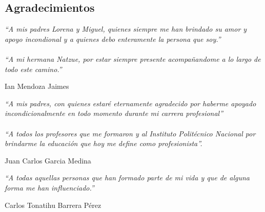 
\begin{comment}
\begin{acknowledgements}

También quisiera reconocer a ... por ...CONACYT,  PAPIIT / etc.
\end{acknowledgements}
\end{comment}

\begin{alwayssingle}
	{
		\pagestyle{empty}
		\vspace{1.5cm}
		{\chapter*{Agradecimientos}
			\noindent 
			\textit{``A mis padres Lorena y Miguel, quienes siempre me han brindado su amor y apoyo incondional y a quienes debo enteramente la persona que soy.''} \\
			\\
			\textit{``A mi hermana Natzue, por estar siempre presente acompañandome a lo largo de todo este camino.''}
			\begin{flushright}
				Ian Mendoza Jaimes
			\end{flushright}

			\noindent 
			\textit{``A mis padres, con quienes estaré eternamente agradecido por haberme apoyado incondicionalmente en todo momento durante mi carrera profesional'' }\\
			\\
			\textit{ ``A todos los profesores que me formaron y al Instituto Politécnico Nacional por brindarme la educación que hoy me define como profesionista''.}
			\begin{flushright}
				Juan Carlos Garcia Medina
			\end{flushright}

			\noindent 
			\textit{``A todas aquellas personas que han formado parte de mi vida y que de alguna forma me han influenciado.''}
			\begin{flushright}
				Carlos Tonatihu Barrera Pérez
			\end{flushright}
			
		}
	}
	
\end{alwayssingle}



